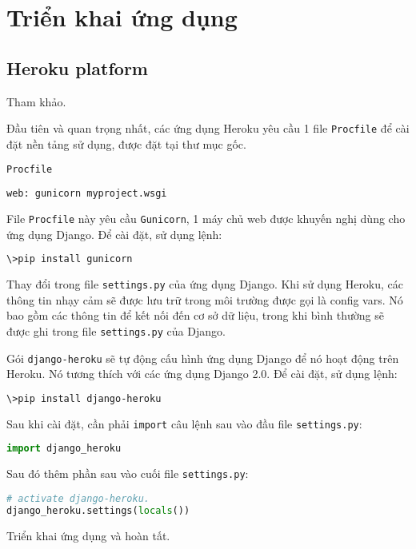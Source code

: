 \section{Triển khai ứng dụng}
\subsection{Heroku platform}
Tham khảo\cite{heroku}.
\\\par
Đầu tiên và quan trọng nhất, các ứng dụng Heroku yêu cầu 1 file \texttt{Procfile} để cài đặt nền tảng sử dụng, được đặt tại thư mục gốc.
\\\par
\texttt{Procfile}
\begin{lstlisting}[language=sh]
web: gunicorn myproject.wsgi
\end{lstlisting}
\par
File \texttt{Procfile} này yêu cầu \texttt{Gunicorn}, 1 máy chủ web được khuyến nghị dùng cho ứng dụng Django. Để cài đặt, sử dụng lệnh:
\begin{lstlisting}[language=bash]
\>pip install gunicorn
\end{lstlisting}
\par
Thay đổi trong file \texttt{settings.py} của ứng dụng Django. Khi sử dụng Heroku, các thông tin nhạy cảm sẽ được lưu trữ trong môi trường được gọi là config vars. Nó bao gồm các thông tin để kết nối đến cơ sở dữ liệu, trong khi bình thường sẽ được ghi trong file \texttt{settings.py} của Django.
\\\par
Gói \texttt{django-heroku} sẽ tự động cấu hình ứng dụng Django để nó hoạt động trên Heroku. Nó tương thích với các ứng dụng Django 2.0. Để cài đặt, sử dụng lệnh:
\begin{lstlisting}[language=bash]
\>pip install django-heroku
\end{lstlisting}
\par
Sau khi cài đặt, cần phải \texttt{import} câu lệnh sau vào đầu file \texttt{settings.py}:
\begin{lstlisting}[language=Python]
import django_heroku
\end{lstlisting}
\par
Sau đó thêm phần sau vào cuối file \texttt{settings.py}:
\begin{lstlisting}[language=Python]
# activate django-heroku.
django_heroku.settings(locals())
\end{lstlisting}
\par
Triển khai ứng dụng và hoàn tất.